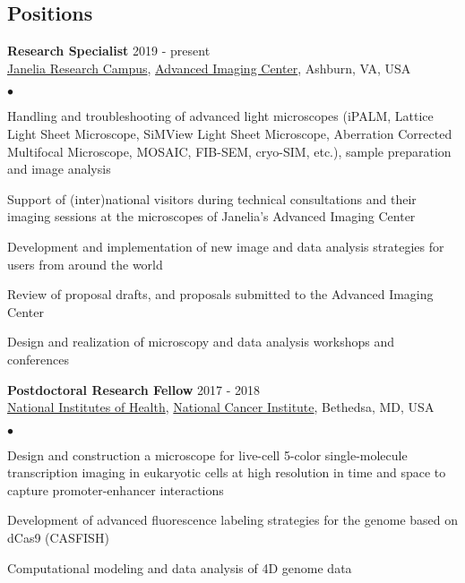 \documentclass[margin,line]{res}
\newenvironment{list2}{
  \begin{list}{$\bullet$}{%
      \setlength{\itemsep}{0in}
      \setlength{\parsep}{0in} \setlength{\parskip}{0in}
      \setlength{\topsep}{0in} \setlength{\partopsep}{0in} 
      \setlength{\leftmargin}{0.2in}}}{\end{list}}
\begin{document}
\begin{resume}

\section{\sc Positions}
{\bf Research Specialist} \hfill {2019 - present}\\
\href{https://www.janelia.org/}{Janelia Research Campus}, \href{https://www.aicjanelia.org/}{Advanced Imaging Center}, Ashburn, VA, USA\\
 \vspace*{-2mm}
\begin{list2}
\vspace*{-1mm}
\item Handling and troubleshooting of  advanced light microscopes (iPALM, Lattice Light Sheet Microscope, SiMView Light Sheet Microscope, Aberration Corrected Multifocal Microscope, MOSAIC, FIB-SEM, cryo-SIM, etc.), sample preparation and image analysis
\item Support of (inter)national visitors during technical consultations and their imaging sessions at the microscopes of  Janelia's Advanced Imaging Center
\item Development and implementation of  new image and data analysis strategies for users from around the world
\item Review of proposal drafts, and proposals submitted to the Advanced Imaging Center
\item Design and realization of  microscopy and data analysis workshops and conferences
\end{list2}
{\bf Postdoctoral Research Fellow} \hfill {2017 - 2018}\\
\href{https://www.nih.gov/}{National Institutes of Health}, \href{https://www.cancer.gov/}{National Cancer Institute}, Bethedsa, MD, USA\\
\vspace*{-2mm}
\begin{list2}
\vspace*{-1mm}
\item Design and construction a microscope for live-cell 5-color single-molecule transcription imaging in eukaryotic cells at high resolution in time and space to capture promoter-enhancer interactions 
\item Development of advanced fluorescence labeling strategies for the genome based on dCas9 (CASFISH)
\item Computational modeling and data analysis of 4D genome data
\end{list2}

\end{resume}
\end{document}
